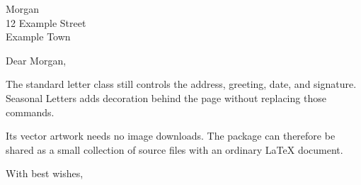 \documentclass[a4paper,11pt]{letter}
\date{5 November 2026}
\begin{document}
\SeasonalReset
\begin{letter}{Morgan\\12 Example Street\\Example Town}
\opening{Dear Morgan,}
The standard letter class still controls the address, greeting, date, and
signature. Seasonal Letters adds decoration behind the page without replacing
those commands.

Its vector artwork needs no image downloads. The package can therefore be
shared as a small collection of source files with an ordinary LaTeX document.
\closing{With best wishes,}
\end{letter}
\end{document}
